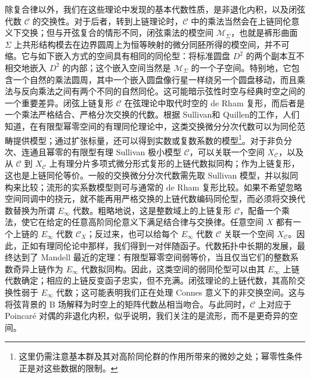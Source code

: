 除复合律以外，我们在这些理论中发现的基本代数性质，是非退化内积，以及闭弦代数 $\mathcal{C}$ 的交换性。对于后者，转到上链理论时，$\mathcal{C}$ 中的乘法当然会在上链同伦意义下交换；但与开弦复合的情形不同，闭弦乘法的模空间 $\mathcal{M}_\Sigma$，也就是裤形曲面 $\Sigma$ 上共形结构模去在边界圆周上为恒等映射的微分同胚所得的模空间，并不可缩。它与如下嵌入方式的空间具有相同的同伦型：将标准圆盘 $D^2$ 的两个副本互不相交地嵌入 $D^2$ 的内部；这个嵌入空间当然是 $\mathcal{M}_\Sigma$ 的一个子空间。特别地，它包含一个自然的乘法圆周，其中一个嵌入圆盘像行星一样绕另一个圆盘移动，而且乘法与反向乘法之间有两个不同的自然同伦。这可能暗示弦性时空与经典时空之间的一个重要差异。闭弦上链复形 $\mathcal{C}$ 在弦理论中取代时空的 de Rham 复形，而后者是一个乘法严格结合、严格分次交换的代数。根据 Sullivan和 Quillen的工作，人们知道，在有限型幂零空间的有理同伦理论中，这类交换微分分次代数可以为同伦范畴提供模型；通过扩张标量，还可以得到实数或复数系数的模型\footnote{这里仍需注意基本群及其对高阶同伦群的作用所带来的微妙之处；幂零性条件正是对这些数据的限制。}。对于非负分次、连通且幂零的有限型有理 Sullivan 极小模型 $\mathcal{C}$，可以关联一个空间 $X_{\mathcal{C}}$，以及从 $\mathcal{C}$ 到 $X_{\mathcal{C}}$ 上有理分片多项式微分形式复形的上链代数拟同构；作为上链复形，这也是上链同伦等价。一般的交换微分分次代数需先取 Sullivan 模型，并以拟同构来比较；流形的实系数模型则可与通常的 de Rham 复形比较。如果不希望忽略空间同调中的挠元，就不能再用严格交换的上链代数编码同伦型，而必须将交换代数替换为所谓 $E_\infty$ 代数。粗略地说，这是整数域上的上链复形 $\mathcal{C}$，配备一个乘法，使它在给定的任意高阶同伦意义下满足结合律与交换律。任意空间 $X$ 都有一个上链的 $E_\infty$ 代数 $\mathcal{C}_X$；反过来，也可以给每个 $E_\infty$ 代数 $\mathcal{C}$ 关联一个空间 $X_{\mathcal{C}}$。因此，正如有理同伦论中那样，我们得到一对伴随函子。代数拓扑中长期的发展，最终达到了 Mandell 最近的定理：有限型幂零空间弱等价，当且仅当它们的整数系数奇异上链作为 $E_\infty$ 代数拟同构。因此，这类空间的弱同伦型可以由其 $E_\infty$ 上链代数确定；相应的上链反变函子忠实，但不充满。闭弦理论的上链代数，其高阶交换性弱于 $E_\infty$ 代数；这可能表明我们正在处理 Connes 意义下的非交换空间。这与将弦背景的 B 场解释为时空上的矩阵代数丛相当吻合。与此同时，$\mathcal{C}$ 上对应于 Poincaré 对偶的非退化内积，似乎说明，我们关注的是流形，而不是更奇异的空间。

